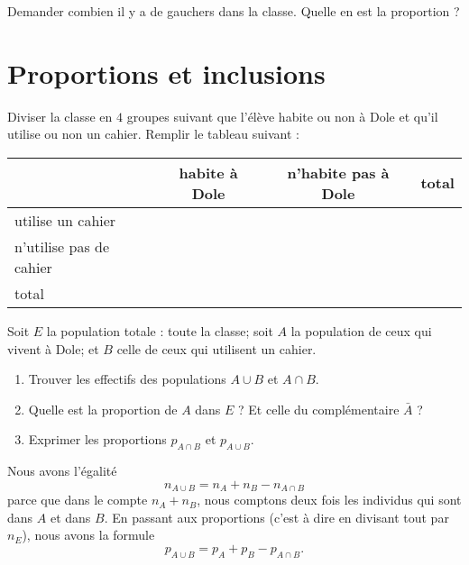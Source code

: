 \begin{example}
    Demander combien il y a de gauchers dans la classe. Quelle en est la proportion ?
\end{example}

\section{Proportions et inclusions}

\begin{example}
    Diviser la classe en \( 4\) groupes suivant que l'élève habite ou non à Dole et qu'il utilise ou non un cahier. Remplir le tableau suivant :

    \begin{center}
    \begin{tabular}{|l||c|c||c|}
        \hline\hline
        & habite à Dole&n'habite pas à Dole&total\\
        \hline
        utilise un cahier&&&\\
        \hline
        n'utilise pas de cahier&&&\\
        \hline\hline
        total&&&\\
        \hline
    \end{tabular}
    \end{center}

    Soit \( E\) la population totale : toute la classe; soit $A$ la population de ceux qui vivent à Dole; et \( B\) celle de ceux qui utilisent un cahier.
    \begin{enumerate}
        \item
            Trouver les effectifs des populations \( A\cup B\) et \( A\cap B\).
        \item
            Quelle est la proportion de \( A\) dans \( E\) ? Et celle du complémentaire \( \bar A\) ?
        \item
            Exprimer les proportions \( p_{A\cap B}\) et \( p_{A\cup B}\).
    \end{enumerate}
\end{example}

Nous avons l'égalité
\begin{equation}
    n_{A\cup B}=n_A+n_B-n_{A\cap B}
\end{equation}
parce que dans le compte \( n_A+n_B\), nous comptons deux fois les individus qui sont dans \( A\) et dans \( B\). En passant aux proportions (c'est à dire en divisant tout par \( n_E\)), nous avons la formule
\begin{equation}
    p_{A\cup B}=p_A+p_B-p_{A\cap B}.
\end{equation}


